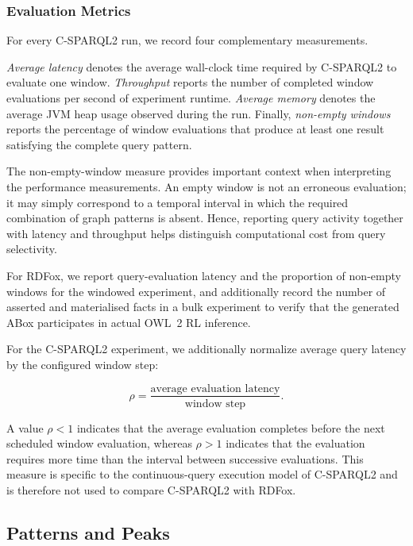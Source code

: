 \subsubsection{Evaluation Metrics}
\label{subsubsec:genact-metrics}

For every C-SPARQL2 run, we record four complementary measurements.

\emph{Average latency} denotes the average wall-clock time required by
C-SPARQL2 to evaluate one window. \emph{Throughput} reports the number of
completed window evaluations per second of experiment runtime.
\emph{Average memory} denotes the average JVM heap usage observed during the
run. Finally, \emph{non-empty windows} reports the percentage of window
evaluations that produce at least one result satisfying the complete query
pattern.

The non-empty-window measure provides important context when interpreting the
performance measurements. An empty window is not an erroneous evaluation; it
may simply correspond to a temporal interval in which the required combination
of graph patterns is absent. Hence, reporting query activity together with
latency and throughput helps distinguish computational cost from query
selectivity.

For RDFox, we report query-evaluation latency and the proportion of non-empty
windows for the windowed experiment, and additionally record the number of
asserted and materialised facts in a bulk experiment to verify that the
generated ABox participates in actual OWL~2 RL inference.

For the C-SPARQL2 experiment, we additionally normalize average query latency
by the configured window step:

\[
    \rho =
    \frac{\text{average evaluation latency}}
         {\text{window step}}.
\]

A value $\rho < 1$ indicates that the average evaluation completes before the
next scheduled window evaluation, whereas $\rho > 1$ indicates that the
evaluation requires more time than the interval between successive evaluations.
This measure is specific to the continuous-query execution model of C-SPARQL2
and is therefore not used to compare C-SPARQL2 with RDFox.


\subsection{Patterns and Peaks}
\label{subsec:genact-patterns-peaks}

